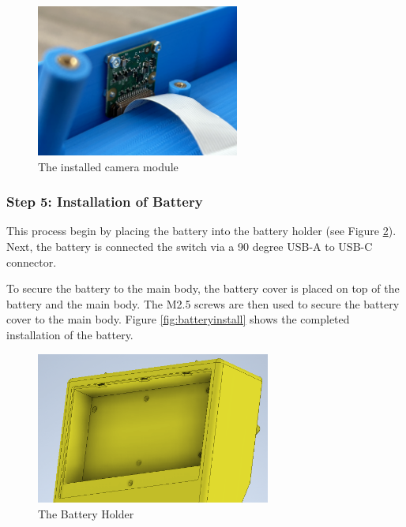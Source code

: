 \begin{figure}
    \centering
    \includegraphics[height=5cm]{texs/Part1/chapter5/image/caminstall.jpg}
    \caption{The installed camera module}
    \label{fig:camerainstall}
\end{figure}

\subsubsection{Step 5: Installation of Battery}
This process begin by placing the battery into the battery holder (see Figure \ref{fig:batteryholder}). Next, the battery is connected the switch via a 90 degree USB-A to USB-C connector.

To secure the battery to the main body, the battery cover is placed on top of the battery and the main body. The M2.5 screws are then used to secure the battery cover to the main body. Figure \ref{fig:batteryinstall} shows the completed installation of the battery.

\begin{figure}
    \centering
    \includegraphics[height=5cm]{texs/Part1/chapter5/image/battslot.png}
    \caption{The Battery Holder}
    \label{fig:batteryholder}
\end{figure}

